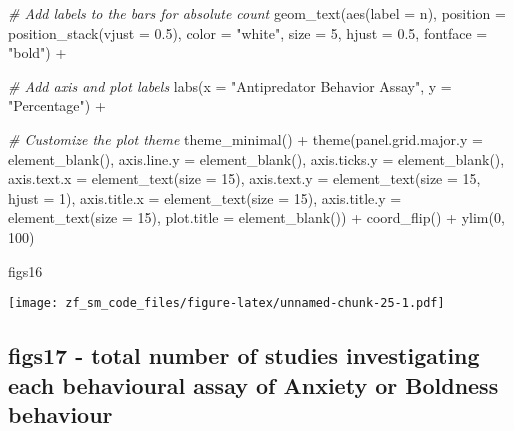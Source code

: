\documentclass[
]{article}
\newenvironment{Shaded}{\begin{snugshade}}{\end{snugshade}}
\newcommand{\AttributeTok}[1]{\textcolor[rgb]{0.77,0.63,0.00}{#1}}
\newcommand{\CommentTok}[1]{\textcolor[rgb]{0.56,0.35,0.01}{\textit{#1}}}
\newcommand{\DecValTok}[1]{\textcolor[rgb]{0.00,0.00,0.81}{#1}}
\newcommand{\FloatTok}[1]{\textcolor[rgb]{0.00,0.00,0.81}{#1}}
\newcommand{\FunctionTok}[1]{\textcolor[rgb]{0.00,0.00,0.00}{#1}}
\newcommand{\NormalTok}[1]{#1}
\newcommand{\SpecialCharTok}[1]{\textcolor[rgb]{0.00,0.00,0.00}{#1}}
\newcommand{\StringTok}[1]{\textcolor[rgb]{0.31,0.60,0.02}{#1}}
\begin{document}
\begin{Shaded}
\begin{Highlighting}[]
  \CommentTok{\# Add labels to the bars for absolute count  }
  \FunctionTok{geom\_text}\NormalTok{(}\FunctionTok{aes}\NormalTok{(}\AttributeTok{label =}\NormalTok{ n), }\AttributeTok{position =} \FunctionTok{position\_stack}\NormalTok{(}\AttributeTok{vjust =} \FloatTok{0.5}\NormalTok{), }\AttributeTok{color =} \StringTok{"white"}\NormalTok{, }\AttributeTok{size =} \DecValTok{5}\NormalTok{, }\AttributeTok{hjust =} \FloatTok{0.5}\NormalTok{, }\AttributeTok{fontface =} \StringTok{"bold"}\NormalTok{) }\SpecialCharTok{+}
  
  \CommentTok{\# Add axis and plot labels}
  \FunctionTok{labs}\NormalTok{(}\AttributeTok{x =} \StringTok{"Antipredator Behavior Assay"}\NormalTok{, }\AttributeTok{y =} \StringTok{"Percentage"}\NormalTok{) }\SpecialCharTok{+}
  
  \CommentTok{\# Customize the plot theme}
  \FunctionTok{theme\_minimal}\NormalTok{() }\SpecialCharTok{+}
  \FunctionTok{theme}\NormalTok{(}\AttributeTok{panel.grid.major.y =} \FunctionTok{element\_blank}\NormalTok{(),}
        \AttributeTok{axis.line.y =} \FunctionTok{element\_blank}\NormalTok{(),}
        \AttributeTok{axis.ticks.y =} \FunctionTok{element\_blank}\NormalTok{(),}
        \AttributeTok{axis.text.x =} \FunctionTok{element\_text}\NormalTok{(}\AttributeTok{size =} \DecValTok{15}\NormalTok{),}
        \AttributeTok{axis.text.y =} \FunctionTok{element\_text}\NormalTok{(}\AttributeTok{size =} \DecValTok{15}\NormalTok{, }\AttributeTok{hjust =} \DecValTok{1}\NormalTok{),}
        \AttributeTok{axis.title.x =} \FunctionTok{element\_text}\NormalTok{(}\AttributeTok{size =} \DecValTok{15}\NormalTok{),}
        \AttributeTok{axis.title.y =} \FunctionTok{element\_text}\NormalTok{(}\AttributeTok{size =} \DecValTok{15}\NormalTok{),}
        \AttributeTok{plot.title =} \FunctionTok{element\_blank}\NormalTok{()) }\SpecialCharTok{+}
  \FunctionTok{coord\_flip}\NormalTok{() }\SpecialCharTok{+}
  \FunctionTok{ylim}\NormalTok{(}\DecValTok{0}\NormalTok{, }\DecValTok{100}\NormalTok{)}

\NormalTok{figs16}
\end{Highlighting}
\end{Shaded}

\texttt{[image: zf\_sm\_code\_files/figure-latex/unnamed-chunk-25-1.pdf]}

\hypertarget{figs17---total-number-of-studies-investigating-each-behavioural-assay-of-anxiety-or-boldness-behaviour}{%
\subsection{figs17 - total number of studies investigating each
behavioural assay of Anxiety or Boldness
behaviour}\label{figs17---total-number-of-studies-investigating-each-behavioural-assay-of-anxiety-or-boldness-behaviour}}
\end{document}
